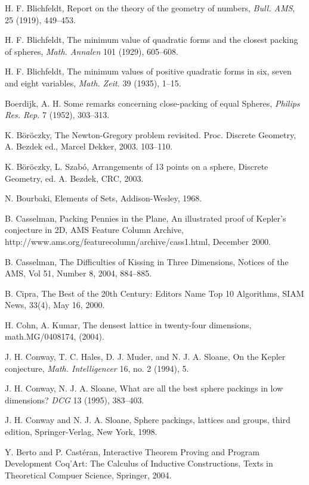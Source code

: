\begin{thebibliography}{CHMS94}
 H. F. Blichfeldt,
    Report on the theory of the geometry of numbers,
    {\it Bull. AMS}, 25 (1919), 449--453.

 H. F. Blichfeldt,
    The minimum value of quadratic forms and the closest
    packing of spheres, {\it Math. Annalen} 101 (1929), 605--608.

 H. F. Blichfeldt,
    The minimum values of positive quadratic forms in six,
    seven and eight variables, {\it Math. Zeit.} 39 (1935), 1--15.

 Boerdijk, A. H. Some remarks concerning close-packing
of equal Spheres, {\it Philips Res. Rep.} 7 (1952), 303--313.


  K. B\"or\"oczky, 
The Newton-Gregory problem revisited. Proc. Discrete Geometry, A. Bezdek ed., Marcel Dekker, 2003. 103--110.

  K. B\"or\"oczky, L. Szab\'o,
Arrangements of 13 points on a sphere, 
Discrete Geometry, ed. A. Bezdek, CRC, 2003.

 N. Bourbaki, Elements of Sets, Addison-Wesley, 1968.

 B. Casselman, Packing Pennies in the Plane,
An illustrated proof of Kepler's conjecture in 2D,  AMS Feature Column
Archive,
http://www.ams.org/featurecolumn/archive/cass1.html, December 2000.

  B. Casselman, The Difficulties of Kissing in
  Three Dimensions, Notices of the AMS,  Vol 51, Number 8, 2004, 884--885.

 B. Cipra, The Best of the 20th Century: Editors
Name Top 10 Algorithms, SIAM News, 33(4), May 16, 2000.

 H. Cohn, A. Kumar, The densest lattice in twenty-four
dimensions, math.MG/0408174, (2004).

 J. H. Conway, T. C. Hales, D. J. Muder, and N. J. A. Sloane,
    On the Kepler conjecture, {\it Math. Intelligencer} 16,
    no. 2 (1994), 5.

  J. H. Conway,  N. J. A. Sloane, What are all the
best sphere packings in low dimensions? {\it DCG} 13 (1995),
383--403.

 J. H. Conway and N. J. A. Sloane, Sphere packings, lattices
    and groups,  third edition, Springer-Verlag, New York, 1998.

 Y. Berto and P. Cast\'eran,
  Interactive Theorem Proving and Program Development Coq'Art: The Calculus
 of Inductive Constructions, Texts in Theoretical Compuer Science, Springer, 2004.


\end{thebibliography}
